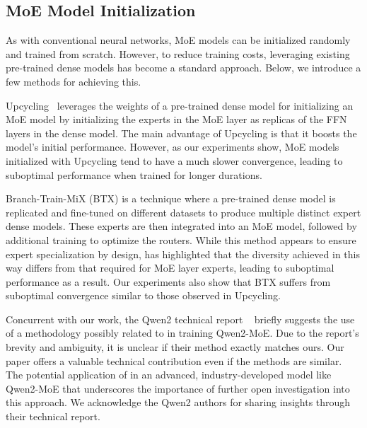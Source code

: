\subsection{MoE Model Initialization}
As with conventional neural networks, MoE models can be initialized randomly and trained from scratch. However, to reduce training costs, leveraging existing pre-trained dense models has become a standard approach. Below, we introduce a few methods for achieving this.


Upcycling~\citep{komatsuzaki2023sparse} leverages the weights of a pre-trained dense model for initializing an MoE model by initializing the experts in the MoE layer as replicas of the FFN layers in the dense model.
The main advantage of Upcycling is that it boosts the model's initial performance.  However, as our experiments show, MoE models initialized with Upcycling tend to have a much slower convergence, leading to suboptimal performance when trained for longer durations.



Branch-Train-MiX (BTX) \citep{sukhbaatar2024branchtrainmix} is a technique where a pre-trained dense model is replicated and fine-tuned on different datasets to produce multiple distinct expert dense models. These experts are then integrated into an MoE model, followed by additional training to optimize the routers. While this method appears to ensure expert specialization by design, \cite{jiang2024mixtralexperts} has highlighted that the diversity achieved in this way differs from that required for MoE layer experts, leading to suboptimal performance as a result. Our experiments also show that BTX suffers from suboptimal convergence similar to those observed in Upcycling.






Concurrent with our work, the Qwen2 technical report ~\citep{yang2024qwen2technicalreport} briefly suggests the use of a methodology possibly related to \methodname{} in training Qwen2-MoE. Due to the report's brevity and ambiguity, it is unclear if their method exactly matches ours. 
Our paper offers a valuable technical contribution even if the methods are similar. 
The potential application of \methodname{} in an advanced, industry-developed model like Qwen2-MoE that underscores the importance of further open investigation into this approach. We acknowledge the Qwen2 authors for sharing insights through their technical report.

